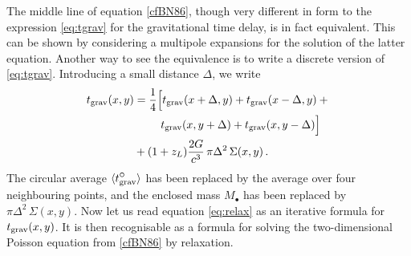 The middle line of equation \eqref{cfBN86}, though very different in
form to the expression \eqref{eq:tgrav} for the gravitational time
delay, is in fact equivalent.  This can be shown by considering a
multipole expansions for the solution of the latter equation.  Another
way to see the equivalence is to write a discrete version of
\eqref{eq:tgrav}.  Introducing a small distance $\Delta$, we write
\begin{equation} \label{eq:relax}
\begin{aligned}
t_{\rm grav}(x,y) &=
\frac14 \Big[ t_{\rm grav}(x+\Delta,y) + t_{\rm grav}(x-\Delta,y) + {}\\
&\kern24pt    t_{\rm grav}(x,y+\Delta) + t_{\rm grav}(x,y-\Delta) \Big] \\
&+ (1+z_L)\frac{2G}{c^3} \, \pi\Delta^2 \, \Sigma(x,y) \,.
\end{aligned}
\end{equation}
The circular average $\langle t_{\rm grav}^{\textstyle\circ} \rangle$ has
been replaced by the average over four neighbouring points, and the
enclosed mass $M_{\textstyle\bullet}$ has been replaced by
$\pi\Delta^2\,\Sigma(x,y)$.  Now let us read equation \eqref{eq:relax}
as an iterative formula for $t_{\rm grav}(x,y)$.  It is then
recognisable as a formula for solving the two-dimensional Poisson
equation from \eqref{cfBN86} by relaxation.

\newpage

